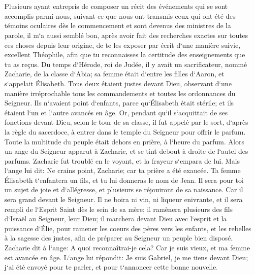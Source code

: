 

\chapter{}

\verse Plusieurs ayant entrepris de composer un récit des événements qui se sont accomplis parmi nous, 
\verse suivant ce que nous ont transmis ceux qui ont été des témoins oculaires dès le commencement et sont devenus des ministres de la parole, 
\verse il m`a aussi semblé bon, après avoir fait des recherches exactes sur toutes ces choses depuis leur origine, de te les exposer par écrit d`une manière suivie, excellent Théophile, 
\verse afin que tu reconnaisses la certitude des enseignements que tu as reçus. 
\verse Du temps d`Hérode, roi de Judée, il y avait un sacrificateur, nommé Zacharie, de la classe d`Abia; sa femme était d`entre les filles d`Aaron, et s`appelait Élisabeth. 
\verse Tous deux étaient justes devant Dieu, observant d`une manière irréprochable tous les commandements et toutes les ordonnances du Seigneur. 
\verse Ils n`avaient point d`enfants, parce qu`Élisabeth était stérile; et ils étaient l`un et l`autre avancés en âge. 
\verse Or, pendant qu`il s`acquittait de ses fonctions devant Dieu, selon le tour de sa classe, il fut appelé par le sort, 
\verse d`après la règle du sacerdoce, à entrer dans le temple du Seigneur pour offrir le parfum. 
\verse Toute la multitude du peuple était dehors en prière, à l`heure du parfum. 
\verse Alors un ange du Seigneur apparut à Zacharie, et se tint debout à droite de l`autel des parfums. 
\verse Zacharie fut troublé en le voyant, et la frayeur s`empara de lui. 
\verse Mais l`ange lui dit: Ne crains point, Zacharie; car ta prière a été exaucée. Ta femme Élisabeth t`enfantera un fils, et tu lui donneras le nom de Jean. 
\verse Il sera pour toi un sujet de joie et d`allégresse, et plusieurs se réjouiront de sa naissance. 
\verse Car il sera grand devant le Seigneur. Il ne boira ni vin, ni liqueur enivrante, et il sera rempli de l`Esprit Saint dès le sein de sa mère; 
\verse il ramènera plusieurs des fils d`Israël au Seigneur, leur Dieu; 
\verse il marchera devant Dieu avec l`esprit et la puissance d`Élie, pour ramener les coeurs des pères vers les enfants, et les rebelles à la sagesse des justes, afin de préparer au Seigneur un peuple bien disposé. 
\verse Zacharie dit à l`ange: A quoi reconnaîtrai-je cela? Car je suis vieux, et ma femme est avancée en âge. 
\verse L`ange lui répondit: Je suis Gabriel, je me tiens devant Dieu; j`ai été envoyé pour te parler, et pour t`annoncer cette bonne nouvelle. 
